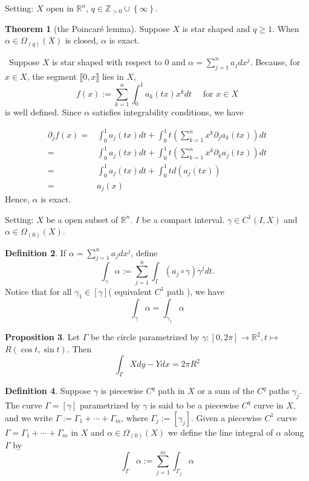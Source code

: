 \documentclass[12pt,a4paper]{book}
\newenvironment{prooff}{{\noindent\it\textcolor{cyan!40!black}{Proof}:}\,}{\par}
\newcommand{\bbrace}[1]{\left\{ #1 \right\} }
\newcommand{\bb}[1]{\mathbb{#1}}
\theoremstyle{definition}
\newtheorem{defn}{Definition}[section]
\newtheorem{theo}[defn]{Theorem}
\newtheorem{prop}[defn]{Proposition}
\begin{document}
Setting: $X$ open in $\bb{R}^n$, $q\in \bb{Z}_{>0}\cup\bbrace{\infty}$. 
\begin{theo}[the Poincaré lemma]
    Suppose $X$ is star shaped and $q \geq 1$. 
    When $\alpha \in \Omega_{(q)}(X)$ is closed, $\alpha$ is exact.

\end{theo}
\begin{prooff}
    Suppose $X$ is star shaped with respect to 0 and $\alpha=\sum_{j=1}^n a_j d x^j$. Because, for $x \in X$, the segment $\llbracket 0, x \rrbracket$ lies in $X$,
    $$
    f(x):=\sum_{k=1}^n \int_0^1 a_k(t x) x^k d t \quad \text { for } x \in X
    $$
    is well defined. Since $\alpha$ satisfies integrability conditions, we have 

\begin{align*} 
\partial_j f(x)=& \int_0^1 a_j(t x) d t+\int_0^1 t\left(\sum_{k=1}^n x^k \partial_j a_k(t x)\right) d t  \\ 
               =& \int_0^1 a_j(t x) d t+\int_0^1 t\left(\sum_{k=1}^n x^k \partial_k a_j(t x)\right) d t \\
               =& \int_0^1 a_j(t x) d t+\int_0^1 td(a_j(tx)) \\
               =& a_j(x)
\end{align*}
Hence, $\alpha$ is exact.
    
\end{prooff}
Setting: $X$ be a open subset of $\bb{R}^n$. 
$I$ be a compact interval. 
$\gamma\in C^1(I,X)$ and $\alpha\in \Omega_{(0)}(X)$.
\begin{defn}
    If $\alpha=\sum_{j=1}^n a_j d x^j$, define
    $$
    \int_\gamma \alpha:=\sum_{j=1}^n \int_I\left(a_j \circ \gamma\right) \dot{\gamma}^j d t.
    $$
    Notice that for all $\gamma_1\in [\gamma]$( equivalent $C^1$ path ), we have 
    \begin{equation*}
        \int_{\gamma} \alpha= \int_{\gamma_1} \alpha
    \end{equation*}
\end{defn}
\begin{prop}
    Let $\Gamma$ be the circle parametrized by $\gamma:[0,2 \pi] \rightarrow \mathbb{R}^2, t \mapsto$ $R(\cos t, \sin t)$. Then
    $$
    \int_{\Gamma} X d y-Y d x=2 \pi R^2
    $$
\end{prop}
\begin{defn}
    Suppose $\gamma$ is piecewise $C^q$ path in $X$ 
    or a sum of the $C^q$ paths $\gamma_j$. 
    The curve $\Gamma=[\gamma]$ parametrized by $\gamma$ is said to be a piecewise $C^q$ curve in $X$, 
    and we write $\Gamma:=\Gamma_1+\cdots+\Gamma_m$, where $\Gamma_j:=\left[\gamma_j\right]$. Given a piecewise $C^1$ curve $\Gamma=\Gamma_1+\cdots+\Gamma_m$ in $X$ and $\alpha \in \Omega_{(0)}(X)$ we define the line integral of $\alpha$ along $\Gamma$ by
    $$
    \int_{\Gamma} \alpha:=\sum_{j=1}^m \int_{\Gamma_j} \alpha
    $$
\end{defn}
\end{document}

